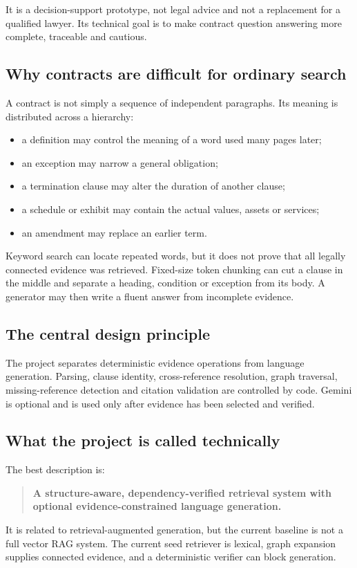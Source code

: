 \documentclass[11pt,letterpaper]{article}
\begin{document}
It is a decision-support prototype, not legal advice and not a replacement for a qualified lawyer. Its technical goal is to make contract question answering more complete, traceable and cautious.

\subsection{Why contracts are difficult for ordinary search}
A contract is not simply a sequence of independent paragraphs. Its meaning is distributed across a hierarchy:
\begin{itemize}
  \item a definition may control the meaning of a word used many pages later;
  \item an exception may narrow a general obligation;
  \item a termination clause may alter the duration of another clause;
  \item a schedule or exhibit may contain the actual values, assets or services;
  \item an amendment may replace an earlier term.
\end{itemize}

Keyword search can locate repeated words, but it does not prove that all legally connected evidence was retrieved. Fixed-size token chunking can cut a clause in the middle and separate a heading, condition or exception from its body. A generator may then write a fluent answer from incomplete evidence.

\subsection{The central design principle}
The project separates deterministic evidence operations from language generation. Parsing, clause identity, cross-reference resolution, graph traversal, missing-reference detection and citation validation are controlled by code. Gemini is optional and is used only after evidence has been selected and verified.

\subsection{What the project is called technically}
The best description is:
\begin{quote}
\textbf{A structure-aware, dependency-verified retrieval system with optional evidence-constrained language generation.}
\end{quote}
It is related to retrieval-augmented generation, but the current baseline is not a full vector RAG system. The current seed retriever is lexical, graph expansion supplies connected evidence, and a deterministic verifier can block generation.
\end{document}
